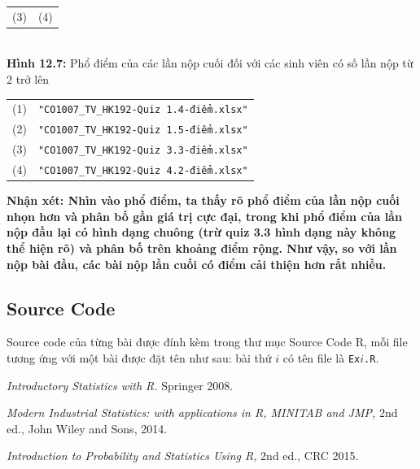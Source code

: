 \documentclass[a4paper]{article}
\theoremstyle{definition}
\begin{document}
\begin{enumerate}[a)]
\begin{itemize}
\begin{center}
\begin{tabular}{c c}
                 (3) & (4)
            \end{tabular}\\
            \textbf{Hình 12.7:} Phổ điểm của các lần nộp cuối đối với các sinh viên có số lần nộp từ 2 trở lên\\
            \begin{tabular}{c c}
                 (1) & \texttt{"CO1007\_TV\_HK192-Quiz 1.4-điểm.xlsx"}\\
                 (2) & \texttt{"CO1007\_TV\_HK192-Quiz 1.5-điểm.xlsx"}\\
                 (3) & \texttt{"CO1007\_TV\_HK192-Quiz 3.3-điểm.xlsx"}\\
                 (4) & \texttt{"CO1007\_TV\_HK192-Quiz 4.2-điểm.xlsx"}
            \end{tabular}
        \end{center}
    \end{itemize}
    \bf Nhận xét: \normalfont Nhìn vào phổ điểm, ta thấy rõ phổ điểm của lần nộp cuối nhọn hơn và phân bố gần giá trị cực đại, trong khi phổ điểm của lần nộp đầu lại có hình dạng chuông (trừ quiz 3.3 hình dạng này không thể hiện rõ) và phân bố trên khoảng điểm rộng. Như vậy, so với lần nộp bài đầu, các bài nộp lần cuối có điểm cải thiện hơn rất nhiều.
\end{enumerate}

\subsection{Source Code}
Source code của từng bài được đính kèm trong thư mục Source Code R, mỗi file tương ứng với một bài được đặt tên như sau: bài thứ $i$ có tên file là \texttt{Ex$i$.R}.


\newpage
{}
\begin{thebibliography}{99999}
 {\em Introductory Statistics with R.}  Springer 2008.

{\em Modern Industrial Statistics: with applications in R, MINITAB and JMP,} 2nd ed.,  John Wiley and Sons, 2014.

{\em Introduction to Probability and Statistics Using R,} 2nd ed., CRC 2015.

\end{thebibliography}
\end{document}
